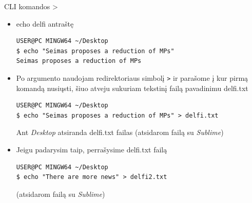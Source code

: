 \documentclass[11pt,xcolor=table]{beamer}
\begin{document}
\begin{frame}[fragile]{CLI komandos >}

\begin{itemize}
\item echo delfi antraštę

\begin{lstlisting}
USER@PC MINGW64 ~/Desktop
$ echo "Seimas proposes a reduction of MPs"
Seimas proposes a reduction of MPs
\end{lstlisting}

\item Po argumento naudojam redirektoriaus simbolį \colorbox{listinggray}{\lstinline|>|} ir parašome į kur pirmą komandą nusiųsti, šiuo atveju sukuriam tekstinį failą pavadinimu delfi.txt 

\begin{lstlisting}
USER@PC MINGW64 ~/Desktop
$ echo "Seimas proposes a reduction of MPs" > delfi.txt
\end{lstlisting}
Ant \textit{Desktop} atsiranda delfi.txt failas (atsidarom failą su \textit{Sublime})

\item Jeigu padarysim taip, perrašysime delfi.txt failą
\begin{lstlisting}
USER@PC MINGW64 ~/Desktop
$ echo "There are more news" > delfi2.txt

\end{lstlisting}
(atsidarom failą su \textit{Sublime})

\end{itemize}
\end{frame}
\end{document}
